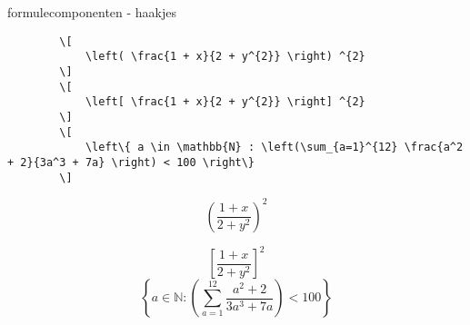 \begin{frame}[fragile]{formulecomponenten - haakjes}
    \begin{verbatim}
        \[
            \left( \frac{1 + x}{2 + y^{2}} \right) ^{2}
        \]
        \[
            \left[ \frac{1 + x}{2 + y^{2}} \right] ^{2}
        \]
        \[
            \left\{ a \in \mathbb{N} : \left(\sum_{a=1}^{12} \frac{a^2 + 2}{3a^3 + 7a} \right) < 100 \right\}   
        \]
    \end{verbatim}
    \begin{tcolorbox}[width=11cm, size=small]
        \[
            \left( \frac{1 + x}{2 + y^{2}} \right)^{2}
        \]

        \[
            \left[ \frac{1 + x}{2 + y^{2}} \right] ^{2}
        \]
        \[
          \left\{ a \in \mathbb{N} : \left(\sum_{a=1}^{12} \frac{a^2 + 2}{3a^3 + 7a} \right) < 100 \right\}   
        \]
    \end{tcolorbox}

\end{frame}
